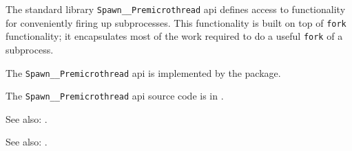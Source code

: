 
The standard library {\tt Spawn\_\_Premicrothread} api defines access to functionality for conveniently 
firing up subprocesses.  This functionality is built on top of  
 {\tt fork} functionality;  it encapsulates most of the 
work required to do a useful {\tt fork} of a subprocess.

The {\tt Spawn\_\_Premicrothread} api is implemented by the  package.

The {\tt Spawn\_\_Premicrothread} api source code is in .


See also:  .

See also:  .
